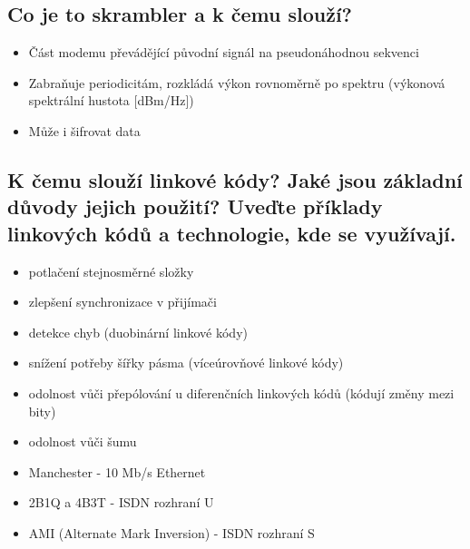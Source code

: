 \subsection{Co je to skrambler a k čemu slouží?}
\begin{itemize}
    \item Část modemu převádějící původní signál na pseudonáhodnou sekvenci
    \item Zabraňuje periodicitám, rozkládá výkon rovnoměrně po spektru (výkonová spektrální hustota [dBm/Hz])
    \item Může i šifrovat  data
\end{itemize}

\subsection{K čemu slouží linkové kódy? Jaké jsou základní důvody jejich použití? Uveďte příklady
linkových kódů a technologie, kde se využívají.}
\begin{itemize}
    \item potlačení stejnosměrné složky
    \item zlepšení synchronizace v přijímači
    \item detekce chyb (duobinární linkové kódy)
    \item snížení potřeby šířky pásma (víceúrovňové linkové kódy)
    \item odolnost vůči přepólování u diferenčních linkových kódů (kódují změny mezi bity)
    \item odolnost vůči šumu
    \item Manchester - 10 Mb/s Ethernet
    \item 2B1Q a 4B3T - ISDN rozhraní U
    \item AMI (Alternate Mark Inversion) - ISDN rozhraní S
\end{itemize}


